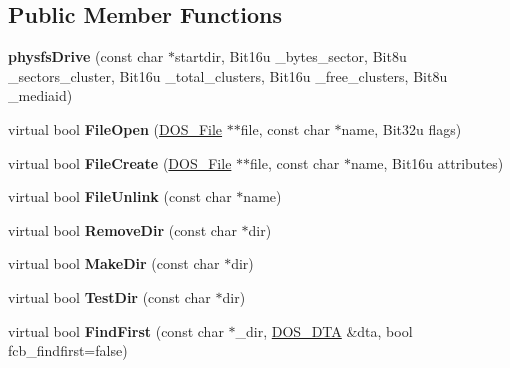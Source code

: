 \subsection*{Public Member Functions}
\begin{DoxyCompactItemize}
\item 
\hypertarget{classphysfsDrive_a468b2710941b0de9f63ec433838b36d1}{{\bfseries physfs\-Drive} (const char $\ast$startdir, Bit16u \-\_\-bytes\-\_\-sector, Bit8u \-\_\-sectors\-\_\-cluster, Bit16u \-\_\-total\-\_\-clusters, Bit16u \-\_\-free\-\_\-clusters, Bit8u \-\_\-mediaid)}\label{classphysfsDrive_a468b2710941b0de9f63ec433838b36d1}

\item 
\hypertarget{classphysfsDrive_ab832ca7bf416300cc77568a6f86f4b5b}{virtual bool {\bfseries File\-Open} (\hyperlink{classDOS__File}{D\-O\-S\-\_\-\-File} $\ast$$\ast$file, const char $\ast$name, Bit32u flags)}\label{classphysfsDrive_ab832ca7bf416300cc77568a6f86f4b5b}

\item 
\hypertarget{classphysfsDrive_a7ef261c6dd183fdfe2c318194284d8d4}{virtual bool {\bfseries File\-Create} (\hyperlink{classDOS__File}{D\-O\-S\-\_\-\-File} $\ast$$\ast$file, const char $\ast$name, Bit16u attributes)}\label{classphysfsDrive_a7ef261c6dd183fdfe2c318194284d8d4}

\item 
\hypertarget{classphysfsDrive_aff155b1009a3282cee8a42536446925b}{virtual bool {\bfseries File\-Unlink} (const char $\ast$name)}\label{classphysfsDrive_aff155b1009a3282cee8a42536446925b}

\item 
\hypertarget{classphysfsDrive_aa1cf8e94c148e5b412331020a2dfe14c}{virtual bool {\bfseries Remove\-Dir} (const char $\ast$dir)}\label{classphysfsDrive_aa1cf8e94c148e5b412331020a2dfe14c}

\item 
\hypertarget{classphysfsDrive_a5c1939cec2cf1408a48b3489fbbaac1e}{virtual bool {\bfseries Make\-Dir} (const char $\ast$dir)}\label{classphysfsDrive_a5c1939cec2cf1408a48b3489fbbaac1e}

\item 
\hypertarget{classphysfsDrive_a4ce2544c59d3485ada9f48af384c3e6c}{virtual bool {\bfseries Test\-Dir} (const char $\ast$dir)}\label{classphysfsDrive_a4ce2544c59d3485ada9f48af384c3e6c}

\item 
\hypertarget{classphysfsDrive_a42d823afcc5fc0c3eefd09846f79dfe8}{virtual bool {\bfseries Find\-First} (const char $\ast$\-\_\-dir, \hyperlink{classDOS__DTA}{D\-O\-S\-\_\-\-D\-T\-A} \&dta, bool fcb\-\_\-findfirst=false)}\label{classphysfsDrive_a42d823afcc5fc0c3eefd09846f79dfe8}


\end{DoxyCompactItemize}
